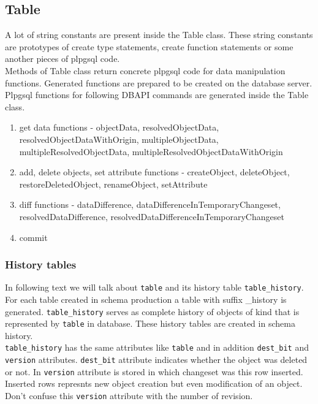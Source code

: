 \documentclass[deska]{subfiles}
\begin{document}
\subsection{Table}
A lot of string constants are present inside the Table class. These string constants are prototypes of create type statements, create function statements or some another pieces of plpgsql code.\\
Methods of Table class return concrete plpgsql code for data manipulation functions. Generated functions are prepared to be created on the database server.\\
Plpgsql functions for following DBAPI commands are generated inside the Table class.

\begin{enumerate}
    \item get data functions - objectData, resolvedObjectData, resolvedObjectDataWithOrigin, multipleObjectData, multipleResolvedObjectData, multipleResolvedObjectDataWithOrigin
    \item add, delete objects, set attribute functions - createObject, deleteObject, restoreDeletedObject, renameObject, setAttribute
    \item diff functions - dataDifference, dataDifferenceInTemporaryChangeset, resolvedDataDifference, resolvedDataDifferenceInTemporaryChangeset
    \item commit
\end{enumerate}

\subsubsection{History tables}
In following text we will talk about {\tt table} and its history table {\tt table\_history}.\\
For each table created in schema production a table with suffix \_history is generated. {\tt table\_history} serves as complete history of objects of kind that is represented by {\tt table} in database. These history tables are created in schema history.\\
{\tt table\_history} has the same attributes like {\tt table} and in addition {\tt dest\_bit} and {\tt version} attributes. {\tt dest\_bit} attribute indicates whether the object was deleted or not. In {\tt version} attribute is stored in which changeset was this row inserted. Inserted rows represnts new object creation but even modification of an object. Don't confuse this {\tt version} attribute with the number of revision.
\end{document}
